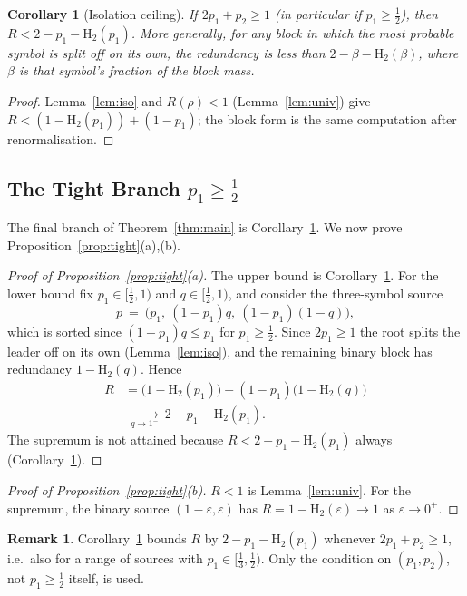 \documentclass[journal]{IEEEtran}
\newtheorem{corollary}{Corollary}
\theoremstyle{definition}
\newtheorem{remark}{Remark}
\newcommand{\Hh}{\mathrm H_2}
\begin{document}
\begin{corollary}[Isolation ceiling]\label{cor:isob}
If $2p_1+p_2\ge1$ \textup{(}in particular if $p_1\ge\tfrac12$\textup{)}, then
$R<2-p_1-\Hh(p_1)$. More generally, for any block in which the most probable symbol is split off on its own, the
redundancy is less than $2-\beta-\Hh(\beta)$, where $\beta$ is that
symbol's fraction of the block mass.
\end{corollary}

\begin{proof}
Lemma~\ref{lem:iso} and $R(\rho)<1$ (Lemma~\ref{lem:univ}) give
$R<(1-\Hh(p_1))+(1-p_1)$; the block form is the same computation after
renormalisation.
\end{proof}

\subsection{The Tight Branch $p_1\ge\tfrac12$}\label{sec:half}

The final branch of Theorem~\ref{thm:main} is Corollary~\ref{cor:isob}. We now
prove Proposition~\ref{prop:tight}(a),(b).

\begin{proof}[Proof of Proposition~\ref{prop:tight}(a)]
The upper bound is Corollary~\ref{cor:isob}. For the lower bound fix
$p_1\in[\tfrac12,1)$ and $q\in[\tfrac12,1)$, and consider the three-symbol source
\[
  p\ =\ \bigl(p_1,\ (1-p_1)q,\ (1-p_1)(1-q)\bigr),
\]
which is sorted since $(1-p_1)q\le p_1$ for $p_1\ge\tfrac12$. Since $2p_1\ge1$
the root splits the leader off on its own (Lemma~\ref{lem:iso}), and the remaining binary block has
redundancy $1-\Hh(q)$. Hence
\[
\begin{aligned}
  R&=\bigl(1-\Hh(p_1)\bigr)+(1-p_1)\bigl(1-\Hh(q)\bigr)\\
  &\ \xrightarrow[q\to1^-]{}\ 2-p_1-\Hh(p_1).
\end{aligned}
\]
The supremum is not attained because $R<2-p_1-\Hh(p_1)$ always
(Corollary~\ref{cor:isob}).
\end{proof}

\begin{proof}[Proof of Proposition~\ref{prop:tight}(b)]
$R<1$ is Lemma~\ref{lem:univ}. For the supremum, the binary source
$(1-\varepsilon,\varepsilon)$ has $R=1-\Hh(\varepsilon)\to1$ as
$\varepsilon\to0^+$.
\end{proof}

\begin{remark}
Corollary~\ref{cor:isob} bounds $R$ by $2-p_1-\Hh(p_1)$ whenever $2p_1+p_2\ge1$,
i.e.\ also for a range of sources with $p_1\in[\tfrac13,\tfrac12)$. Only the
condition on $(p_1,p_2)$, not $p_1\ge\tfrac12$ itself, is used.
\end{remark}
\end{document}
